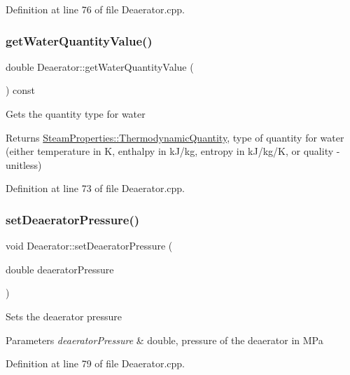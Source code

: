 Definition at line 76 of file Deaerator.\+cpp.

\mbox{\label{class_deaerator_a9362430fb04802b6f14c9bf09d62a466}} 
\subsubsection{\texorpdfstring{get\+Water\+Quantity\+Value()}{getWaterQuantityValue()}}
{\footnotesize\ttfamily double Deaerator\+::get\+Water\+Quantity\+Value (\begin{DoxyParamCaption}{ }\end{DoxyParamCaption}) const}

Gets the quantity type for water \begin{DoxyReturn}{Returns}
\hyperlink{class_steam_properties_ae0294bedf7d178c2d8fb6aed0f62fbff}{Steam\+Properties\+::\+Thermodynamic\+Quantity}, type of quantity for water (either temperature in K, enthalpy in k\+J/kg, entropy in k\+J/kg/K, or quality -\/ unitless) 
\end{DoxyReturn}


Definition at line 73 of file Deaerator.\+cpp.

\mbox{\label{class_deaerator_a5b20d3aba98b21928cce70b45e843ff3}} 
\subsubsection{\texorpdfstring{set\+Deaerator\+Pressure()}{setDeaeratorPressure()}}
{\footnotesize\ttfamily void Deaerator\+::set\+Deaerator\+Pressure (\begin{DoxyParamCaption}\item[{double}]{deaerator\+Pressure }\end{DoxyParamCaption})}

Sets the deaerator pressure 
\begin{DoxyParams}{Parameters}
{\em deaerator\+Pressure} & double, pressure of the deaerator in M\+Pa \\
\hline
\end{DoxyParams}


Definition at line 79 of file Deaerator.\+cpp.

